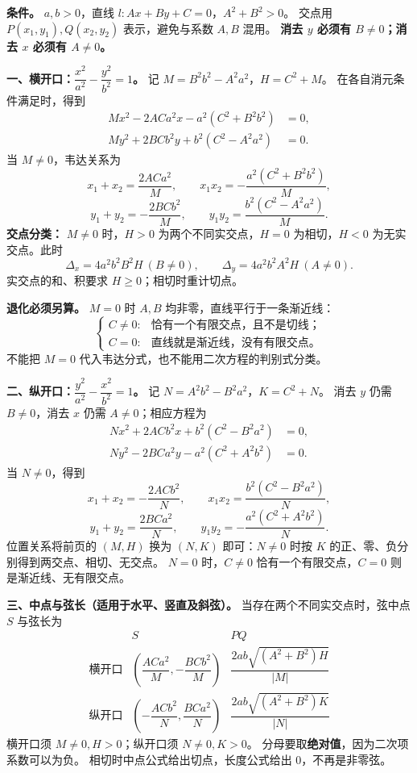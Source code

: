 \begin{statementbox}
\textbf{条件。} $a,b>0$，直线 $l:Ax+By+C=0$，$A^2+B^2>0$。
交点用 $P(x_1,y_1),Q(x_2,y_2)$ 表示，避免与系数 $A,B$ 混用。
\textbf{消去 $y$ 必须有 $B\ne0$；消去 $x$ 必须有 $A\ne0$。}

\textbf{一、横开口：$\dfrac{x^2}{a^2}-\dfrac{y^2}{b^2}=1$。}
记 $M=B^2b^2-A^2a^2$，$H=C^2+M$。
在各自消元条件满足时，得到
\[
 \begin{aligned}
 Mx^2-2ACa^2x-a^2(C^2+B^2b^2)&=0,\\
 My^2+2BCb^2y+b^2(C^2-A^2a^2)&=0.
 \end{aligned}
\]
当 $M\ne0$，韦达关系为
\[
 \boxed{x_1+x_2=\frac{2ACa^2}{M}},\qquad
 \boxed{x_1x_2=-\frac{a^2(C^2+B^2b^2)}{M}},
\]
\[
 \boxed{y_1+y_2=-\frac{2BCb^2}{M}},\qquad
 \boxed{y_1y_2=\frac{b^2(C^2-A^2a^2)}{M}}.
\]
\textbf{交点分类：} $M\ne0$ 时，$H>0$ 为两个不同实交点，$H=0$ 为相切，$H<0$ 为无实交点。此时
\[
 \Delta_x=4a^2b^2B^2H\ (B\ne0),\qquad
 \Delta_y=4a^2b^2A^2H\ (A\ne0).
\]
实交点的和、积要求 $H\ge0$；相切时重计切点。

\textbf{退化必须另算。} $M=0$ 时 $A,B$ 均非零，直线平行于一条渐近线：
\[
 \begin{cases}
 C\ne0: &\text{恰有一个有限交点，且不是切线；}\\
 C=0: &\text{直线就是渐近线，没有有限交点。}
 \end{cases}
\]
不能把 $M=0$ 代入韦达分式，也不能用二次方程的判别式分类。
\end{statementbox}
\clearpage
\begin{statementbox}
\textbf{二、纵开口：$\dfrac{y^2}{a^2}-\dfrac{x^2}{b^2}=1$。}
记 $N=A^2b^2-B^2a^2$，$K=C^2+N$。
消去 $y$ 仍需 $B\ne0$，消去 $x$ 仍需 $A\ne0$；相应方程为
\[
 \begin{aligned}
 Nx^2+2ACb^2x+b^2(C^2-B^2a^2)&=0,\\
 Ny^2-2BCa^2y-a^2(C^2+A^2b^2)&=0.
 \end{aligned}
\]
当 $N\ne0$，得到
\[
 \boxed{x_1+x_2=-\frac{2ACb^2}{N}},\qquad
 \boxed{x_1x_2=\frac{b^2(C^2-B^2a^2)}{N}},
\]
\[
 \boxed{y_1+y_2=\frac{2BCa^2}{N}},\qquad
 \boxed{y_1y_2=-\frac{a^2(C^2+A^2b^2)}{N}}.
\]
位置关系将前页的 $(M,H)$ 换为 $(N,K)$ 即可：$N\ne0$ 时按 $K$ 的正、零、负分别得到两交点、相切、无交点。
$N=0$ 时，$C\ne0$ 恰有一个有限交点，$C=0$ 则是渐近线、无有限交点。

\textbf{三、中点与弦长（适用于水平、竖直及斜弦）。}
当存在两个不同实交点时，弦中点 $S$ 与弦长为
\[
 \begin{array}{c|c|c}
 & S & PQ\\[3pt]\hline
 \text{横开口} & \left(\dfrac{ACa^2}{M},-\dfrac{BCb^2}{M}\right)
 & \dfrac{2ab\sqrt{(A^2+B^2)H}}{|M|}\\[10pt]
 \text{纵开口} & \left(-\dfrac{ACb^2}{N},\dfrac{BCa^2}{N}\right)
 & \dfrac{2ab\sqrt{(A^2+B^2)K}}{|N|}
 \end{array}
\]
横开口须 $M\ne0,H>0$；纵开口须 $N\ne0,K>0$。
分母要取\textbf{绝对值}，因为二次项系数可以为负。
相切时中点公式给出切点，长度公式给出 $0$，不再是非零弦。
\end{statementbox}
\clearpage
